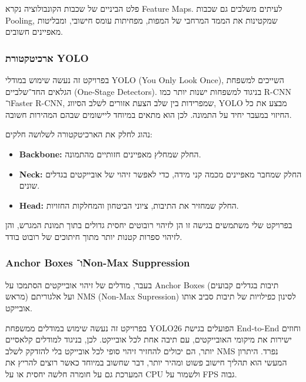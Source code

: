 פלט הביניים של שכבות הקונבולוציה נקרא \textenglish{Feature
Maps}. לעיתים משלבים גם שכבות \textenglish{Pooling}, שמקטינות את הממד
המרחבי של המפות, מפחיתות עומס חישובי, ומבליטות מאפיינים חשובים.

\subsubsection{ארכיטקטורת \textenglish{YOLO}}

בפרויקט זה נעשה שימוש במודלי \textenglish{YOLO} (\textenglish{You Only
Look Once}), השייכים למשפחת הגלאים החד־שלביים (\textenglish{One-Stage
Detectors}). בניגוד למשפחות ישנות יותר כמו \textenglish{R-CNN}
ו־\textenglish{Faster R-CNN}, שמפרידות בין שלב הצעת אזורים לשלב
הסיווג, \textenglish{YOLO} מבצע את כל החיזוי במעבר יחיד על התמונה. לכן
הוא מתאים במיוחד ליישומים שבהם המהירות חשובה.

נהוג לחלק את הארכיטקטורה לשלושה חלקים:
\begin{itemize}
\item \textbf{\textenglish{Backbone}:} החלק שמחלץ מאפיינים חזותיים
  מהתמונה.
\item \textbf{\textenglish{Neck}:} החלק שמחבר מאפיינים מכמה קני מידה,
  כדי לאפשר זיהוי של אובייקטים בגדלים שונים.
\item \textbf{\textenglish{Head}:} החלק שמחזיר את התיבות, ציוני
  הביטחון והמחלקות החזויות.
\end{itemize}

בפרויקט שלי משתמשים בגישה זו הן לזיהוי רובוטים יחסית גדולים בתוך תמונת
המגרש, והן לזיהוי ספרות קטנות יותר מתוך חיתוכים של רובוט בודד.

\subsubsection{\textenglish{Anchor Boxes} ו־\textenglish{Non-Max
    Suppression}}

בעבר, מודלים של זיהוי אובייקטים הסתמכו על \textenglish{Anchor Boxes}
(תיבות בגדלים קבועים מראש) ועל אלגוריתם \textenglish{NMS (Non-Max
  Supression)} לסינון כפילויות של תיבות סביב אותו אובייקט.

בפרויקט זה נעשה שימוש במודלים ממשפחת \textenglish{YOLO26} הפועלים
בגישת \textenglish{End-to-End} וחוזים ישירות את מיקומי האובייקטים, עם
תיבה אחת לכל אובייקט. לכן, בניגוד למודלים קלאסיים יותר, הם יכולים
להחזיר זיהוי סופי לכל אובייקט בלי להזדקק לשלב \textenglish{NMS} נפרד.
היתרון המעשי הוא תהליך חישוב פשוט ומהיר יותר, דבר שחשוב במיוחד כאשר
רוצים להריץ את המערכת גם על חומרה חלשה יחסית או על \textenglish{CPU}
ולשמור על \textenglish{FPS} גבוה.

